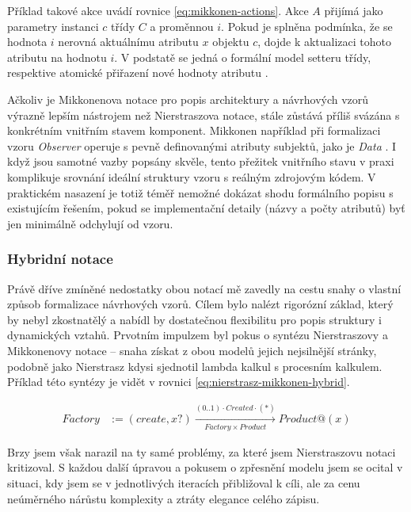 \documentclass[FM,DP,fonts]{tulthesis}
\begin{document}
Příklad takové akce uvádí rovnice \ref{eq:mikkonen-actions}. Akce $A$ přijímá jako parametry instanci $c$ třídy $C$ a proměnnou $i$. Pokud je splněna podmínka, že se hodnota $i$ nerovná aktuálnímu atributu $x$ objektu $c$, dojde k aktualizaci tohoto atributu na hodnotu $i$. V podstatě se jedná o formální model setteru třídy, respektive atomické přiřazení nové hodnoty atributu \parencite{mikkonen-formalizing-patterns}.

Ačkoliv je Mikkonenova notace pro popis architektury a návrhových vzorů výrazně lepším nástrojem než Nierstraszova notace, stále zůstává příliš svázána s konkrétním vnitřním stavem komponent. Mikkonen například při formalizaci vzoru \textit{Observer} operuje s pevně definovanými atributy subjektů, jako je \textit{Data} \parencite{mikkonen-formalizing-patterns}. I když jsou samotné vazby popsány skvěle, tento přežitek vnitřního stavu v praxi komplikuje srovnání ideální struktury vzoru s reálným zdrojovým kódem. V praktickém nasazení je totiž téměř nemožné dokázat shodu formálního popisu s existujícím řešením, pokud se implementační detaily (názvy a počty atributů) byť jen minimálně odchylují od vzoru.

\subsubsection{Hybridní notace}
Právě dříve zmíněné nedostatky obou notací mě zavedly na cestu snahy o vlastní způsob formalizace návrhových vzorů. Cílem bylo nalézt rigorózní základ, který by nebyl zkostnatělý a nabídl by dostatečnou flexibilitu pro popis struktury i dynamických vztahů. Prvotním impulzem byl pokus o syntézu Nierstraszovy a Mikkonenovy notace – snaha získat z obou modelů jejich nejsilnější stránky, podobně jako Nierstrasz kdysi sjednotil lambda kalkul s procesním kalkulem. Příklad této syntézy je vidět v rovnici \ref{eq:nierstrasz-mikkonen-hybrid}.

\begin{align}
	Factory & := (create, x?) \xrightarrow[Factory \times Product]{(0..1) \cdot Created \cdot (*)} \label{eq:nierstrasz-mikkonen-hybrid} Product @ (x)
\end{align}

Brzy jsem však narazil na ty samé problémy, za které jsem Nierstraszovu notaci kritizoval. S každou další úpravou a pokusem o zpřesnění modelu jsem se ocital v situaci, kdy jsem se v jednotlivých iteracích přibližoval k cíli, ale za cenu neúměrného nárůstu komplexity a ztráty elegance celého zápisu.
\end{document}
